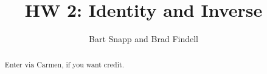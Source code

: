 \documentclass[handout,space,nooutcomes]{xourse}
\title{HW 2: Identity and Inverse}
\author{Bart Snapp and Brad Findell}
\begin{document}
\begin{abstract}
Enter via Carmen, if you want credit.  
\end{abstract}
\maketitle

{}
\end{document}
